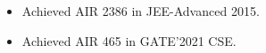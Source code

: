 \documentclass[
	a4paper,
]{fortysecondscv}
\begin{document}
\begin{cvtable}[0.5]
	\cvitem{}{}{}
	{
	\vspace{-30pt}
	\begin{itemize}[leftmargin=-2cm]
	\item Achieved AIR 2386 in JEE-Advanced 2015.
	\item Achieved AIR 465 in GATE'2021 CSE.
     \vspace{-5pt}
	\end{itemize}
	}
\end{cvtable}


		















\iffalse
\cvsignature
\fi
\end{document}
